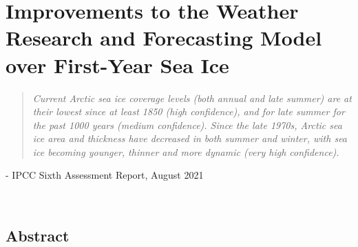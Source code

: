 \chapter{Improvements to the Weather Research and Forecasting Model over First-Year Sea Ice}
\vspace{1 cm}
\begin{spacing}{1} \begin{quote} 
\noindent \emph{Current Arctic sea ice coverage levels (both annual and late summer) are at their lowest since at least 1850 (high confidence), and for late summer for the past 1000 years (medium confidence). Since the late 1970s, Arctic sea ice area and thickness have decreased in both summer and winter, with sea ice becoming younger, thinner and more dynamic (very high confidence).}\end{quote}
\hspace{6 cm} - IPCC Sixth Assessment Report, August 2021  
\end{spacing}
\vspace{1 cm}
\noindent 
\vspace{1 cm}\\

\section*{Abstract}

